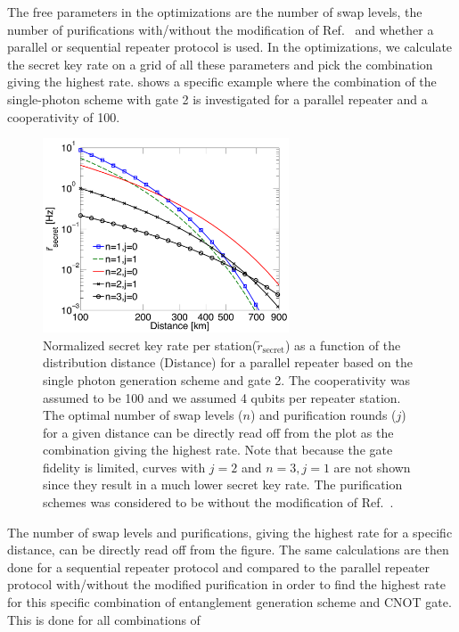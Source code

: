 The free parameters in the optimizations are the number of swap levels, the
number of purifications with/without the modification of Ref.~\cite{nickerson}
and whether a parallel or sequential repeater protocol is used. In the
optimizations, we calculate the secret key rate on a grid of all these
parameters and pick the combination giving the highest rate.
 shows a specific example where the combination of the
single-photon scheme with gate 2 is investigated for a parallel repeater and a
cooperativity of 100.
\begin{figure} 
\centering
\includegraphics[width=0.65\textwidth]{./figs_Borregaard_PRA2015/figureX6}
\caption[Example of repeater architecture]{Normalized secret key rate per
station($\tilde{r}_{\mathrm{secret}}$) as a function of the distribution distance
(Distance) for a parallel repeater based on the single photon generation scheme
and gate 2. The cooperativity was assumed to be 100 and we assumed 4 qubits per
repeater station. The optimal number of swap levels ($n$) and purification
rounds ($j$) for a given distance can be directly read off from the plot as the
combination giving the highest rate. Note that because the gate fidelity is
limited, curves with $j=2$ and $n=3,j=1$ are not shown since they result in a
much lower secret key rate. The purification schemes was considered to be
without the modification of Ref.~\cite{nickerson}.}
\label{fig:figureX6}
\end{figure} 
The number of swap levels and purifications, giving the highest rate for a
specific distance, can be directly read off from the figure. The same
calculations are then done for a sequential repeater protocol and compared to
the parallel repeater protocol with/without the modified purification in order
to find the highest rate for this specific combination of entanglement
generation scheme and CNOT gate. This is done for all combinations of
